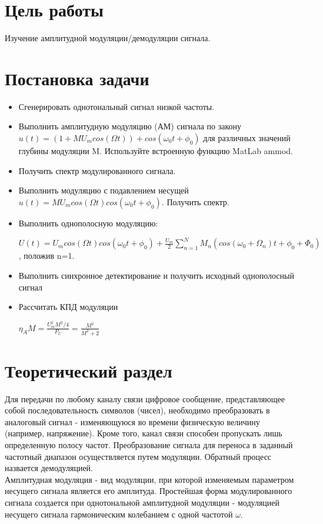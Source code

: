 \documentclass[a4paper]{article}
\begin{document}
\vfill %

\section{Цель работы}
Изучение амплитудной модуляции/демодуляции сигнала.

\section{Постановка задачи}
\begin{itemize}
	\item Сгенерировать однотональный сигнал низкой частоты.
	\item Выполнить амплитудную модуляцию (АМ) сигнала по закону $u(t)=(1+MU_mcos(\Omega t))+cos(\omega_0t+\phi_0)$ для различных значений глубины модуляции M. Используйте встроенную функцию
	MatLab ammod.
	\item Получить спектр модулированного сигнала.
	\item Выполнить модуляцию с подавлением несущей $u(t)=MU_mcos(\Omega t)cos(\omega_0 t+\phi_0)$. Получить спектр.
	\item  Выполнить однополосную модуляцию:
		
	$U(t)=U_mcos(\Omega t)cos(\omega_0t+\phi_0)+\frac{U_m}{2}\sum_{n=1}^{N}M_n(cos(\omega_0+\Omega_n)t+\phi_0+\Phi_0)$, положив n=1.
	\item Выполнить синхронное детектирование и получить исходный однополосный сигнал
	\item Рассчитать КПД модуляции
	
	$\eta_AM=\frac{U_m^2M^2/4}{P_U}=\frac{M^2}{M^2+2}$
\end{itemize}


\section{Теоретический раздел}
Для передачи по любому каналу связи цифровое сообщение, представляющее собой последовательность символов (чисел), необходимо преобразовать в аналоговый сигнал - изменяющуюся во времени физическую величину (например, напряжение). Кроме того, канал связи способен пропускать лишь определенную полосу частот. Преобразование сигнала для переноса в заданный частотный диапазон осуществляется путем модуляции. Обратный процесс назвается демодуляцией.\\

Амплитудная модуляция - вид модуляции, при которой изменяемым параметром несущего сигнала является его амплитуда. Простейшая форма модулированного сигнала создается при однотональной амплитудной модуляции - модуляцией несущего сигнала гармоническим колебанием с одной частотой $\omega$.\\
\end{document}
